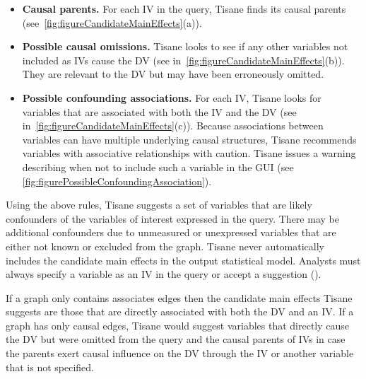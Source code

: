 \begin{itemize}    
    \item \textbf{Causal parents.} For each IV in the query, Tisane finds its
    causal parents (see~\autoref{fig:figureCandidateMainEffects}(a)).
    \item \textbf{Possible causal omissions.} Tisane looks to see if any other
    variables not included as IVs cause the DV 
    (see
    in~\autoref{fig:figureCandidateMainEffects}(b)). They are relevant to the DV
    but may have been erroneously omitted.
    \item \textbf{Possible confounding associations.} For each IV, Tisane looks
    for variables that are associated with both the IV and the DV (see
    in~\autoref{fig:figureCandidateMainEffects}(c)). Because associations
    between variables can have multiple underlying causal structures, Tisane
    recommends variables with associative relationships with caution. Tisane
    issues a warning describing when not to include such a variable in the GUI (see \autoref{fig:figurePossibleConfoundingAssociation}).
\end{itemize}

\figureCandidateMainEffects


Using the above rules, Tisane suggests a set of variables that are likely
confounders of the variables of interest expressed in the query. There may be
additional confounders due to unmeasured or unexpressed variables that are either
not known or excluded from the graph. Tisane never automatically includes the
candidate main effects in the output statistical model. Analysts must always
specify a variable as an IV in the query or accept a suggestion (\dcGuidance).

If a graph only contains associates edges then the candidate main effects Tisane
suggests are those that are directly associated with both the DV and an IV. If a
graph has only causal edges, Tisane would suggest variables that directly cause
the DV but were omitted from the query and the causal parents of IVs in case the
parents exert causal influence on the DV through the IV or another variable that is not
specified.

